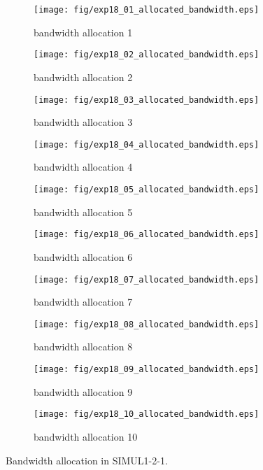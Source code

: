 	\begin{figure}
		\begin{center}
			\begin{subfigure}[b]{0.32\textwidth}
				\texttt{[image: fig/exp18\_01\_allocated\_bandwidth.eps]}
				\caption{bandwidth allocation 1}
				\label{figure:simul1_2_1_b_a}
			\end{subfigure}
			\begin{subfigure}[b]{0.32\textwidth}
				\texttt{[image: fig/exp18\_02\_allocated\_bandwidth.eps]}
				\caption{bandwidth allocation 2}
				\label{figure:simul1_2_1_b_b}
			\end{subfigure}
			\begin{subfigure}[b]{0.32\textwidth}
				\texttt{[image: fig/exp18\_03\_allocated\_bandwidth.eps]}
				\caption{bandwidth allocation 3}
				\label{figure:simul1_2_1_b_c}
			\end{subfigure}
			\begin{subfigure}[b]{0.32\textwidth}
				\texttt{[image: fig/exp18\_04\_allocated\_bandwidth.eps]}
				\caption{bandwidth allocation 4}
				\label{figure:simul1_2_1_b_d}
			\end{subfigure}
			\begin{subfigure}[b]{0.32\textwidth}
				\texttt{[image: fig/exp18\_05\_allocated\_bandwidth.eps]}
				\caption{bandwidth allocation 5}
				\label{figure:simul1_2_1_b_e}
			\end{subfigure}
			\begin{subfigure}[b]{0.32\textwidth}
				\texttt{[image: fig/exp18\_06\_allocated\_bandwidth.eps]}
				\caption{bandwidth allocation 6}
				\label{figure:simul1_2_1_b_f}
			\end{subfigure}
			\begin{subfigure}[b]{0.32\textwidth}
				\texttt{[image: fig/exp18\_07\_allocated\_bandwidth.eps]}
				\caption{bandwidth allocation 7}
				\label{figure:simul1_2_1_b_g}
			\end{subfigure}
			\begin{subfigure}[b]{0.32\textwidth}
				\texttt{[image: fig/exp18\_08\_allocated\_bandwidth.eps]}
				\caption{bandwidth allocation 8}
				\label{figure:simul1_2_1_b_h}
			\end{subfigure}
			\begin{subfigure}[b]{0.32\textwidth}
				\texttt{[image: fig/exp18\_09\_allocated\_bandwidth.eps]}
				\caption{bandwidth allocation 9}
				\label{figure:simul1_2_1_b_i}
			\end{subfigure}
			\begin{subfigure}[b]{0.32\textwidth}
				\texttt{[image: fig/exp18\_10\_allocated\_bandwidth.eps]}
				\caption{bandwidth allocation 10}
				\label{figure:simul1_2_1_b_j}
			\end{subfigure}
			\caption{Bandwidth allocation in SIMUL1-2-1.}
			\label{figure:simul1_2_1_ba}
		\end{center}
	\end{figure}

